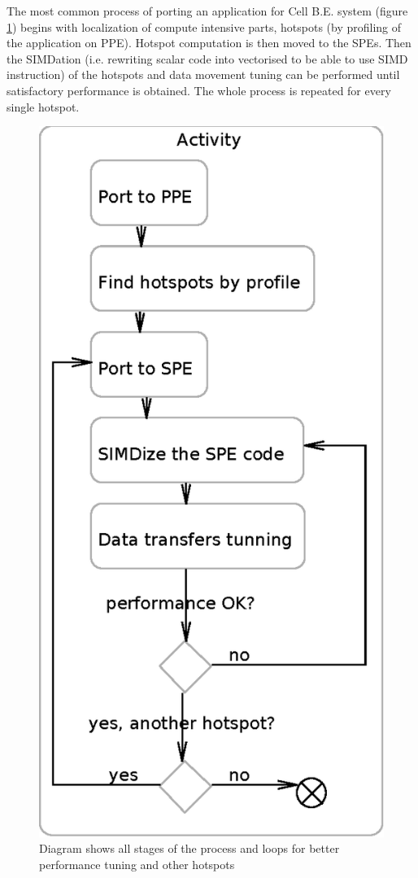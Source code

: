 \par
The most common process of porting an application for Cell B.E. system (figure \ref{fg:appPorting}) begins with localization of compute intensive parts, hotspots (by profiling of the application on PPE).
 Hotspot computation is then moved to the SPEs.
 Then the SIMDation (i.e. rewriting scalar code into vectorised to be able to use SIMD instruction) of the hotspots and data movement tuning can be performed until satisfactory performance is obtained.
 The whole process is repeated for every single hotspot.

\begin{figure}
    \centering
    \includegraphics[height=\textwidth]{data/portingCycle}
    \caption[Application for Cell B.E. porting process]{Diagram shows all stages of the process and loops for better performance tuning and other hotspots}
    \label{fg:appPorting}
\end{figure}
